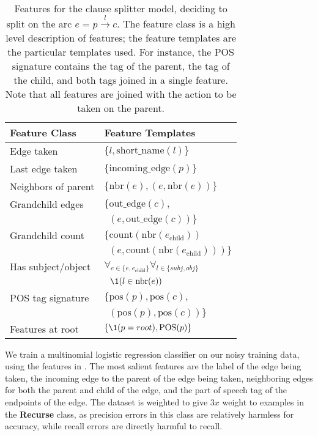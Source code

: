 \begin{table}
\begin{tabular}{ll}
  \textbf{Feature Class} & \textbf{Feature Templates} \\
  \hline
  Edge taken          & $\{ l, \textrm{short\_name}(l) \}$ \\
  Last edge taken     & $\{ \textrm{incoming\_edge}(p) \}$ \\
  Neighbors of parent & $\{ \textrm{nbr}(e), (e, \textrm{nbr}(e)) \}$ \\
  Grandchild edges    & $\{ \textrm{out\_edge}(c), $ \\
                      & $~~ (e, \textrm{out\_edge}(c)) \}$ \\
  Grandchild count    & $\{ \textrm{count}\left( \textrm{nbr}(e_\textrm{child}) \right) $ \\
                      & $~~ \left(e, \textrm{count}\left( \textrm{nbr}(e_\textrm{child}) \right) \right) \}$ \\
  Has subject/object  & $\forall_{e \in \{e, e_\textrm{child}\}} \forall_{l \in \{\textit{subj}, \textit{obj}\}} $ \\
                      & $~~ \1(l \in \textrm{nbr}(e)) $ \\
  POS tag signature   & $\{ \textrm{pos}(p), \textrm{pos}(c), $ \\
                      & $~~ \left( \textrm{pos}(p), \textrm{pos}(c) \right) \}$ \\
  Features at root    & $\{ \1(p = root), \textrm{POS}(p) \}$
\end{tabular}
\caption{\label{tab:features}
Features for the clause splitter model, deciding to split on the arc
  $e = p \xrightarrow{l} c$.
The feature class is a high level description of features; the feature
  templates are the particular templates used.
For instance, the POS signature contains the tag of the parent, the tag of
  the child, and both tags joined in a single feature.
Note that all features are joined with the action to be taken on the parent.
}
\end{table}

We train a multinomial logistic regression classifier on our noisy
  training data, using the features in .
The most salient features are the label of the edge being taken, the
  incoming edge to the parent of the edge being taken, neighboring edges
  for both the parent and child of the edge, and the part of speech tag of
  the endpoints of the edge.
The dataset is weighted to give $3x$ weight to examples in the \textbf{Recurse}
  class, as precision errors in this class are relatively harmless for accuracy,
  while recall errors are directly harmful to recall.

